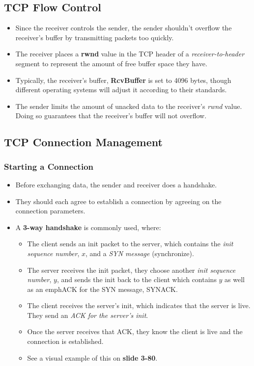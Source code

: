 \documentclass{article}
\begin{document}
\subsection{TCP Flow Control}

\begin{itemize}
\item Since the receiver controls the sender, the sender shouldn't overflow the receiver's buffer by transmitting packets too quickly.
\item The receiver places a {\bf rwnd} value in the TCP header of a \emph{receiver-to-header} segment to represent the amount of free buffer space they have.
\item Typically, the receiver's buffer, {\bf RcvBuffer} is set to 4096 bytes, though different operating systems will adjust it according to their standards.
\item The sender limits the amount of unacked data to the receiver's \emph{rwnd} value. Doing so guarantees that the receiver's buffer will not overflow.
\end{itemize}

\subsection{TCP Connection Management}

\subsubsection{Starting a Connection}
\begin{itemize}
\item Before exchanging data, the sender and receiver does a handshake.
\item They should each agree to establish a connection by agreeing on the connection parameters.
\item A {\bf 3-way handshake} is commonly used, where:
\begin{itemize}
\item The client sends an init packet to the server, which contains the \emph{init sequence number}, $x$, and a \emph{SYN message} (synchronize).
\item The server receives the init packet, they choose another \emph{init sequence number}, $y$, and sends the init back to the client which contains $y$ as well as an emph{ACK for the SYN message, SYNACK}.
\item The client receives the server's init, which indicates that the server is live. They send an \emph{ACK for the server's init}.
\item Once the server receives that ACK, they know the client is live and the connection is established.
\item See a visual example of this on {\bf slide 3-80}.
\end{itemize}
\end{itemize}
\end{document}
